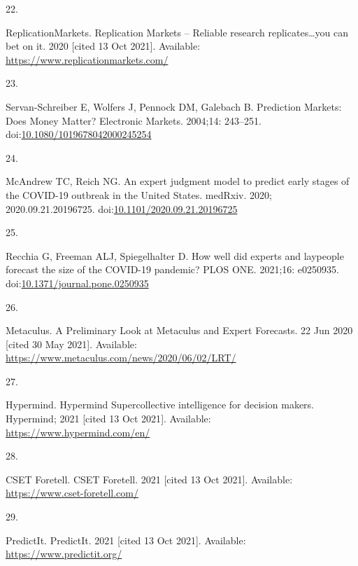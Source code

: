 \documentclass[10pt,letterpaper]{article}
\newlength{\cslhangindent}
\newlength{\csllabelwidth}
\newlength{\cslentryspacingunit} %
\newenvironment{CSLReferences}[2] %
 {%
  \setlength{\parindent}{0pt}
  \ifodd #1
  \let\oldpar\par
  \def\par{\hangindent=\cslhangindent\oldpar}
  \fi
  \setlength{\parskip}{#2\cslentryspacingunit}
 }%
 {}
\newcommand{\CSLLeftMargin}[1]{\parbox[t]{\csllabelwidth}{#1}}
\newcommand{\CSLRightInline}[1]{\parbox[t]{\linewidth - \csllabelwidth}{#1}\break}
\begin{document}
\begin{CSLReferences}{0}{0}
\leavevmode{}%
\CSLLeftMargin{22. }%
\CSLRightInline{ReplicationMarkets. Replication {Markets} -- {Reliable}
research replicates\ldots you can bet on it. 2020 {[}cited 13 Oct
2021{]}. Available: \url{https://www.replicationmarkets.com/}}

\leavevmode{}%
\CSLLeftMargin{23. }%
\CSLRightInline{Servan-Schreiber E, Wolfers J, Pennock DM, Galebach B.
Prediction {Markets}: {Does Money Matter}? Electronic Markets. 2004;14:
243--251.
doi:\href{https://doi.org/10.1080/1019678042000245254}{10.1080/1019678042000245254}}

\leavevmode{}%
\CSLLeftMargin{24. }%
\CSLRightInline{McAndrew TC, Reich NG. An expert judgment model to
predict early stages of the {COVID-19} outbreak in the {United States}.
medRxiv. 2020; 2020.09.21.20196725.
doi:\href{https://doi.org/10.1101/2020.09.21.20196725}{10.1101/2020.09.21.20196725}}

\leavevmode{}%
\CSLLeftMargin{25. }%
\CSLRightInline{Recchia G, Freeman ALJ, Spiegelhalter D. How well did
experts and laypeople forecast the size of the {COVID-19} pandemic? PLOS
ONE. 2021;16: e0250935.
doi:\href{https://doi.org/10.1371/journal.pone.0250935}{10.1371/journal.pone.0250935}}

\leavevmode{}%
\CSLLeftMargin{26. }%
\CSLRightInline{Metaculus. A {Preliminary Look} at {Metaculus} and
{Expert Forecasts}. 22 Jun 2020 {[}cited 30 May 2021{]}. Available:
\url{https://www.metaculus.com/news/2020/06/02/LRT/}}

\leavevmode{}%
\CSLLeftMargin{27. }%
\CSLRightInline{Hypermind. Hypermind \textbar{} {Supercollective}
intelligence for decision makers. {Hypermind}; 2021 {[}cited 13 Oct
2021{]}. Available: \url{https://www.hypermind.com/en/}}

\leavevmode{}%
\CSLLeftMargin{28. }%
\CSLRightInline{CSET Foretell. {CSET Foretell}. 2021 {[}cited 13 Oct
2021{]}. Available: \url{https://www.cset-foretell.com/}}

\leavevmode{}%
\CSLLeftMargin{29. }%
\CSLRightInline{PredictIt. {PredictIt}. 2021 {[}cited 13 Oct 2021{]}.
Available: \url{https://www.predictit.org/}}


\end{CSLReferences}
\end{document}

